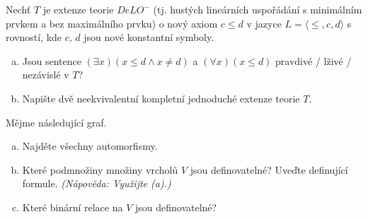 \begin{problem}

    Nechť $T$ je extenze teorie $DeLO^-$ (tj. hustých lineárních uspořádání s minimálním prvkem a bez maximálního prvku) o nový axiom $c \le d$ v jazyce $L=\langle \le,c,d\rangle$ s rovností, kde $c$, $d$ jsou nové konstantní symboly.
    \begin{enumerate}[(a)]
        \item Jsou sentence $(\exists x)(x\le d \wedge x \ne d)$ a $(\forall x)(x \le d)$ pravdivé / lživé / nezávislé v $T$?
        \item Napište dvě neekvivalentní kompletní jednoduché extenze teorie $T$.
    \end{enumerate}
    
\end{problem}


\begin{problem}

    Mějme následující graf.
    \smallskip
    
    \begin{minipage}{.72\textwidth}
        \begin{enumerate}[(a)]
            \item Najděte všechny automorfismy.
            \item Které podmnožiny množiny vrcholů $V$ jsou definovatelné? Uveďte definující formule. {\it (Nápověda: Využijte (a).)}
            \item Které binární relace na $V$ jsou definovatelné?
        \end{enumerate}
    \end{minipage}%
    \begin{minipage}{.28\textwidth}        
        \vspace{-12pt}\hspace{12pt}
    \end{minipage}%

\end{problem}


